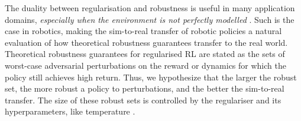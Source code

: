 \documentclass{article} %
\begin{document}
            The duality between regularisation and robustness is useful in many application domains, 
            \textit{especially when the environment is not perfectly modelled} 
            \citep{derman_twice_regularized, TGM_2025_jiralerspong}.
            Such is the case in robotics, making the sim-to-real transfer of robotic policies a natural evaluation of how theoretical robustness guarantees transfer to the real world.
            Theoretical robustness guarantees for regularised RL are stated as the sets of worst-case adversarial perturbations on the reward or dynamics for which the policy still achieves high return.
            Thus, we hypothesize that the larger the robust set, the more robust a policy to perturbations, and the better the sim-to-real transfer. The size of these robust sets is controlled by the regulariser and its hyperparameters, like temperature \citep{eysenbach2022maximum, derman_twice_regularized, pmlr-v130-husain21a_reg_pol_rew_rob, brekelmans2022_divergence_robustness}.
            
\end{document}
